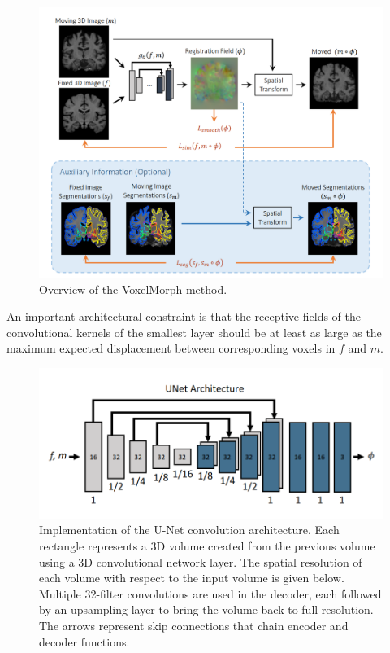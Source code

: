 \documentclass{book}
\begin{document}
	\begin{figure}[h!]
		\centering
		\includegraphics[width=0.9\columnwidth]{resources/chapter2/vxm.png}
		\caption{Overview of the VoxelMorph method. \cite{Balakrishnan_2019}}
		\label{fig:vxm}
	\end{figure}
	
	An important architectural constraint is that the receptive fields of the convolutional kernels of the smallest layer should be at least as large as the maximum expected displacement between corresponding voxels in $f$ and $m$.
	
	\begin{figure}[h!]
		\centering
		\includegraphics[width=0.8\columnwidth]{resources/chapter2/vxm_unet.png}
		\caption{Implementation of the U-Net convolution architecture. Each rectangle represents a 3D volume created from the previous volume using a 3D convolutional network layer. The spatial resolution of each volume with respect to the input volume is given below. Multiple 32-filter convolutions are used in the decoder, each followed by an upsampling layer to bring the volume back to full resolution. The arrows represent skip connections that chain encoder and decoder functions. \cite{Balakrishnan_2019}}
		\label{fig:vxm_unet}
	\end{figure}
	
\end{document}

